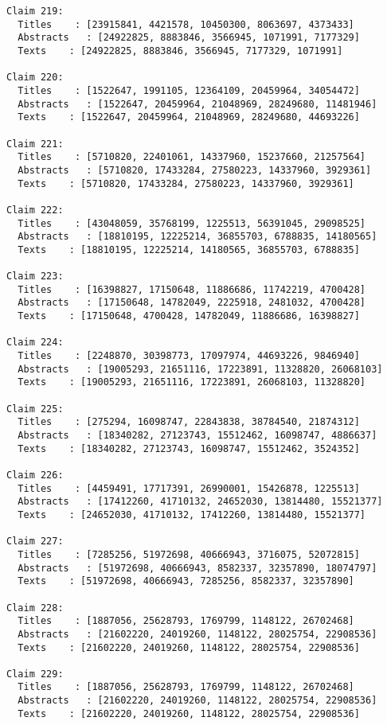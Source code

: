 \documentclass[11pt]{article}
\begin{document}
\begin{Verbatim}[commandchars=\\\{\}]
Claim 219:
  Titles    : [23915841, 4421578, 10450300, 8063697, 4373433]
  Abstracts   : [24922825, 8883846, 3566945, 1071991, 7177329]
  Texts    : [24922825, 8883846, 3566945, 7177329, 1071991]

Claim 220:
  Titles    : [1522647, 1991105, 12364109, 20459964, 34054472]
  Abstracts   : [1522647, 20459964, 21048969, 28249680, 11481946]
  Texts    : [1522647, 20459964, 21048969, 28249680, 44693226]

Claim 221:
  Titles    : [5710820, 22401061, 14337960, 15237660, 21257564]
  Abstracts   : [5710820, 17433284, 27580223, 14337960, 3929361]
  Texts    : [5710820, 17433284, 27580223, 14337960, 3929361]

Claim 222:
  Titles    : [43048059, 35768199, 1225513, 56391045, 29098525]
  Abstracts   : [18810195, 12225214, 36855703, 6788835, 14180565]
  Texts    : [18810195, 12225214, 14180565, 36855703, 6788835]

Claim 223:
  Titles    : [16398827, 17150648, 11886686, 11742219, 4700428]
  Abstracts   : [17150648, 14782049, 2225918, 2481032, 4700428]
  Texts    : [17150648, 4700428, 14782049, 11886686, 16398827]

Claim 224:
  Titles    : [2248870, 30398773, 17097974, 44693226, 9846940]
  Abstracts   : [19005293, 21651116, 17223891, 11328820, 26068103]
  Texts    : [19005293, 21651116, 17223891, 26068103, 11328820]

Claim 225:
  Titles    : [275294, 16098747, 22843838, 38784540, 21874312]
  Abstracts   : [18340282, 27123743, 15512462, 16098747, 4886637]
  Texts    : [18340282, 27123743, 16098747, 15512462, 3524352]

Claim 226:
  Titles    : [4459491, 17717391, 26990001, 15426878, 1225513]
  Abstracts   : [17412260, 41710132, 24652030, 13814480, 15521377]
  Texts    : [24652030, 41710132, 17412260, 13814480, 15521377]

Claim 227:
  Titles    : [7285256, 51972698, 40666943, 3716075, 52072815]
  Abstracts   : [51972698, 40666943, 8582337, 32357890, 18074797]
  Texts    : [51972698, 40666943, 7285256, 8582337, 32357890]

Claim 228:
  Titles    : [1887056, 25628793, 1769799, 1148122, 26702468]
  Abstracts   : [21602220, 24019260, 1148122, 28025754, 22908536]
  Texts    : [21602220, 24019260, 1148122, 28025754, 22908536]

Claim 229:
  Titles    : [1887056, 25628793, 1769799, 1148122, 26702468]
  Abstracts   : [21602220, 24019260, 1148122, 28025754, 22908536]
  Texts    : [21602220, 24019260, 1148122, 28025754, 22908536]


\end{Verbatim}
\end{document}
